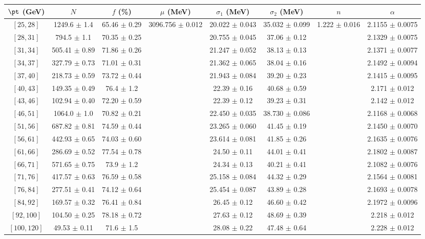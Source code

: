 \begin{tabular}{c||c|c|c|c|c|c|c}
$\pt$ (GeV) & $N$ & $f$ (\%) & $\mu$ (MeV) & $\sigma_1$ (MeV) & $\sigma_2$ (MeV) & $n$ & $\alpha$ \\
\hline
$[25, 28]$ & 1249.6 $\pm$ 1.4 & 65.46 $\pm$ 0.29 & \multirow{17}{*}{3096.756 $\pm$ 0.012} & 20.022 $\pm$ 0.043 & 35.032 $\pm$ 0.099 & \multirow{17}{*}{1.222 $\pm$ 0.016} & 2.1155 $\pm$ 0.0075\\
$[28, 31]$ & 794.5 $\pm$ 1.1 & 70.35 $\pm$ 0.25 &  & 20.755 $\pm$ 0.045 & 37.06 $\pm$ 0.12 &  & 2.1329 $\pm$ 0.0075\\
$[31, 34]$ & 505.41 $\pm$ 0.89 & 71.86 $\pm$ 0.26 &  & 21.247 $\pm$ 0.052 & 38.13 $\pm$ 0.13 &  & 2.1371 $\pm$ 0.0077\\
$[34, 37]$ & 327.79 $\pm$ 0.73 & 71.01 $\pm$ 0.31 &  & 21.362 $\pm$ 0.065 & 38.04 $\pm$ 0.16 &  & 2.1492 $\pm$ 0.0094\\
$[37, 40]$ & 218.73 $\pm$ 0.59 & 73.72 $\pm$ 0.44 &  & 21.943 $\pm$ 0.084 & 39.20 $\pm$ 0.23 &  & 2.1415 $\pm$ 0.0095\\
$[40, 43]$ & 149.35 $\pm$ 0.49 & 76.4 $\pm$ 1.2 &  & 22.39 $\pm$ 0.16 & 40.68 $\pm$ 0.59 &  & 2.171 $\pm$ 0.012\\
$[43, 46]$ & 102.94 $\pm$ 0.40 & 72.20 $\pm$ 0.59 &  & 22.39 $\pm$ 0.12 & 39.23 $\pm$ 0.31 &  & 2.142 $\pm$ 0.012\\
$[46, 51]$ & 1064.0 $\pm$ 1.0 & 70.82 $\pm$ 0.21 &  & 22.450 $\pm$ 0.035 & 38.730 $\pm$ 0.086 &  & 2.1168 $\pm$ 0.0068\\
$[51, 56]$ & 687.82 $\pm$ 0.81 & 74.59 $\pm$ 0.44 &  & 23.265 $\pm$ 0.060 & 41.45 $\pm$ 0.19 &  & 2.1450 $\pm$ 0.0070\\
$[56, 61]$ & 442.93 $\pm$ 0.65 & 74.03 $\pm$ 0.60 &  & 23.614 $\pm$ 0.081 & 41.85 $\pm$ 0.26 &  & 2.1635 $\pm$ 0.0076\\
$[61, 66]$ & 286.69 $\pm$ 0.52 & 77.54 $\pm$ 0.78 &  & 24.50 $\pm$ 0.11 & 44.01 $\pm$ 0.41 &  & 2.1802 $\pm$ 0.0087\\
$[66, 71]$ & 571.65 $\pm$ 0.75 & 73.9 $\pm$ 1.2 &  & 24.34 $\pm$ 0.13 & 40.21 $\pm$ 0.41 &  & 2.1082 $\pm$ 0.0076\\
$[71, 76]$ & 417.57 $\pm$ 0.63 & 76.59 $\pm$ 0.58 &  & 25.158 $\pm$ 0.084 & 44.32 $\pm$ 0.29 &  & 2.1564 $\pm$ 0.0081\\
$[76, 84]$ & 277.51 $\pm$ 0.41 & 74.12 $\pm$ 0.64 &  & 25.454 $\pm$ 0.087 & 43.89 $\pm$ 0.28 &  & 2.1693 $\pm$ 0.0078\\
$[84, 92]$ & 169.57 $\pm$ 0.32 & 76.41 $\pm$ 0.84 &  & 26.45 $\pm$ 0.12 & 46.60 $\pm$ 0.42 &  & 2.1972 $\pm$ 0.0096\\
$[92, 100]$ & 104.50 $\pm$ 0.25 & 78.18 $\pm$ 0.72 &  & 27.63 $\pm$ 0.12 & 48.69 $\pm$ 0.39 &  & 2.218 $\pm$ 0.012\\
$[100, 120]$ & 49.53 $\pm$ 0.11 & 71.6 $\pm$ 1.5 &  & 28.08 $\pm$ 0.22 & 47.48 $\pm$ 0.64 &  & 2.228 $\pm$ 0.012\\
\end{tabular}
